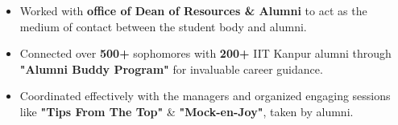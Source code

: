 \documentclass[10pt]{extarticle}
\begin{document}
\vspace{-8pt}
\begin{itemize}
\item  Worked with \textbf{office of Dean of Resources \& Alumni} to act as the medium of contact between the student body  and alumni.
\item Connected over \textbf{500+} sophomores with \textbf{200+} IIT Kanpur alumni through \textbf{"Alumni Buddy Program"} for invaluable career guidance.
\item Coordinated effectively with the managers and organized  engaging sessions like \textbf{"Tips From The Top"} \& \textbf{"Mock-en-Joy"}, taken by alumni.
\end{itemize}
\vspace{-8pt}






\vspace{1mm}
\medskip
\end{document}
